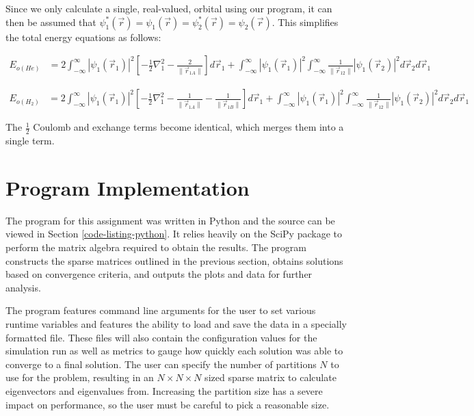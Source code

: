 \documentclass[10pt, oneside, letterpaper]{article}
\begin{document}
Since we only calculate a single, real-valued, orbital using our program, it can then be assumed that $\psi_1^\ast(\vec{r}) = \psi_1(\vec{r}) = \psi_2^\ast(\vec{r}) = \psi_2(\vec{r})$. This simplifies the total energy equations as follows:

\begin{align*}
  E_{o(He)} &= 2\int_{-\infty}^{\infty} \left|\psi_1(\vec{r}_1)\right|^2 \left[ -\frac{1}{2}\nabla_1^2 - \frac{2}{\|\vec{r}_{1 A}\|} \right] d\vec{r}_1 + 
   \int_{-\infty}^{\infty} \left|\psi_1(\vec{r}_1)\right|^2 \int_{-\infty}^{\infty} \frac{1}{\|\vec{r}_{12}\|} \left|\psi_1(\vec{r}_2)\right|^2 d\vec{r}_2d\vec{r}_1
\end{align*}

\begin{align*}
  E_{o(H_2)} &= 2\int_{-\infty}^{\infty} \left|\psi_1(\vec{r}_1)\right|^2 \left[ -\frac{1}{2}\nabla_1^2 - \frac{1}{\|\vec{r}_{1 A}\|} - \frac{1}{\|\vec{r}_{1 B}\|} \right] d\vec{r}_1 +
   \int_{-\infty}^{\infty} \left|\psi_1(\vec{r}_1)\right|^2 \int_{-\infty}^{\infty} \frac{1}{\|\vec{r}_{12}\|} \left|\psi_1(\vec{r}_2)\right|^2 d\vec{r}_2d\vec{r}_1
\end{align*}

The $\frac{1}{2}$ Coulomb and exchange terms become identical, which merges them into a single term.

\newpage
\section{Program Implementation}

The program for this assignment was written in Python and the source can be viewed in Section \ref{code-listing-python}. It relies heavily on the SciPy package to perform the matrix algebra required to obtain the results. The program constructs the sparse matrices outlined in the previous section, obtains solutions based on convergence criteria, and outputs the plots and data for further analysis.

The program features command line arguments for the user to set various runtime variables and features the ability to load and save the data in a specially formatted file. These files will also contain the configuration values for the simulation run as well as metrics to gauge how quickly each solution was able to converge to a final solution. The user can specify the number of partitions $N$ to use for the problem, resulting in an $N \times N \times N$ sized sparse matrix to calculate eigenvectors and eigenvalues from. Increasing the partition size has a severe impact on performance, so the user must be careful to pick a reasonable size.
\end{document}
